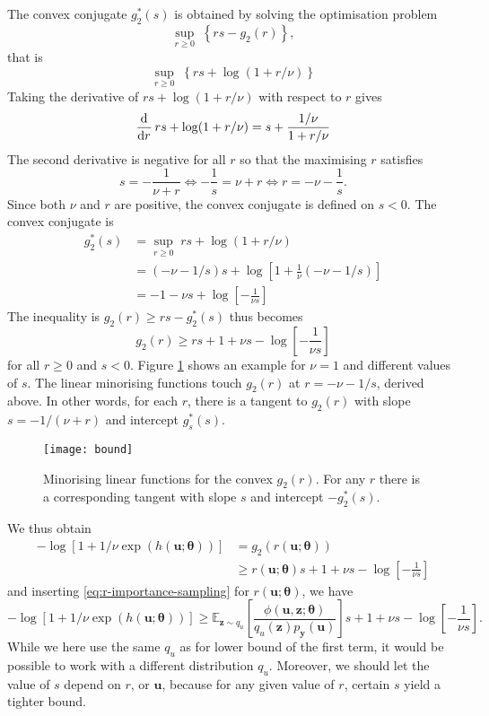 \documentclass[11pt, oneside]{article}
\newcommand{\thetab}{{\boldsymbol{\theta}}}
\newcommand{\pnn}{\phi}
\newcommand{\pnoise}{p_{ \mathbf y}}
\renewcommand{\u}{{\mathbf u}}
\newcommand{\z}{{\mathbf z}}
\newcommand{\E}{\mathbb{E}}
\begin{document}
The convex conjugate $g_2^*(s)$ is obtained by solving the optimisation problem $$\sup_{r\ge 0} \; \left\{ rs - g_2(r)\right\},$$ that is
\begin{equation}
   \sup_{r\ge 0} \; \left\{rs + \log(1+r/\nu )\right\}
\end{equation}
Taking the derivative of  $rs + \log(1+r/\nu)$ with respect to $r$ gives
\begin{equation}
  \dod{}{r} rs + \log(1+r/\nu) = s + \frac{1/\nu}{1+r/ \nu}
\end{equation}
The second derivative is negative for all $r$ so that the maximising $r$ satisfies
\begin{equation}
  s  = - \frac{1}{\nu+r} \Longleftrightarrow -\frac{1}{s} = \nu + r \Longleftrightarrow r = -\nu -\frac{1}{s}.
\end{equation}
Since both $\nu$ and $r$ are positive, the convex conjugate is defined on $s<0$.
The convex conjugate is
\begin{align}
  g_2^*(s) & =   \sup_{r\ge 0} \; rs + \log(1+r/\nu ) \\
  & = (-\nu-1/s) s + \log\left[1+ \frac{1}{\nu} (-\nu-1/s)\right]\\
  & = -1 -\nu s + \log\left[ -\frac{1}{\nu s}\right]
\end{align}
The inequality is $g_2(r) \ge rs - g_2^*(s)$ thus becomes
\begin{equation}
  g_2(r) \ge rs + 1+ \nu s - \log\left[ -\frac{1}{\nu s}\right] 
\end{equation}
for all $r\ge 0$ and $s<0$. Figure \ref{fig:bound} shows an example
for $\nu=1$ and different values of $s$. The linear minorising
functions touch $g_2(r)$ at $r=-\nu-1/s$, derived above. In other
words, for each $r$, there is a tangent to $g_2(r)$ with slope $s = -1/(\nu+r)$
and intercept $g_s^*(s)$.
\begin{figure}[ht]
  \centering
  \texttt{[image: bound]}
  \caption{\label{fig:bound} Minorising linear functions for the convex $g_2(r)$. For any $r$ there is a corresponding tangent with slope $s$ and intercept $-g_2^*(s)$.}
\end{figure}

We thus obtain
\begin{align}
  - \log [1+1/\nu \exp(h(\u;\thetab))] &= g_2(r(\u;\thetab))\\
  &\ge  r(\u;\thetab)s + 1+ \nu s - \log\left[ -\frac{1}{\nu s}\right]
\end{align}
and inserting \eqref{eq:r-importance-sampling} for $r(\u;\thetab)$, we have
\begin{equation}
  - \log [1+1/\nu \exp(h(\u;\thetab))] \ge \E_{\z \sim q_u} \left[\frac{\pnn(\u,\z; \thetab)}{q_u(\z) \pnoise(\u)}\right] s  + 1+ \nu s - \log\left[ -\frac{1}{\nu s}\right].
\end{equation}
While we here use the same $q_u$ as for lower bound of the first term, it would be possible to work with a different distribution $q_u$. Moreover, we should let the value of $s$ depend on $r$, or $\u$, because for any given value of $r$, certain $s$ yield a tighter bound.
\end{document}
